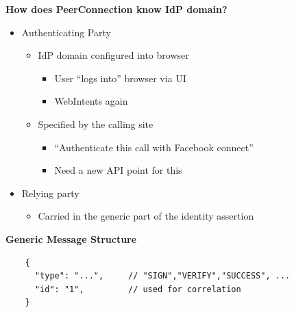 \documentclass[helvetica]{seminar}
\newcommand{\heading}[1]{%
  \begin{center} 
    \large\bf 
    #1 
  \end{center} 
  \vspace{.4 in}}
\begin{document}
\begin{slide}
\heading{How does PeerConnection know IdP domain?}

\begin{itemize}
\item Authenticating Party

  \begin{itemize}
  \item IdP domain configured into browser
    \begin{itemize}
    \item User ``logs into'' browser via UI
    \item WebIntents again
    \end{itemize}

  \item Specified by the calling site
    \begin{itemize}
    \item ``Authenticate this call with Facebook connect''
    \item Need a new API point for this
    \end{itemize}
  \end{itemize}

\item Relying party
  \begin{itemize}
  \item Carried in the generic part of the identity assertion
  \end{itemize}
\end{itemize}

\end{slide}



\begin{slide}
\heading{Generic Message Structure}

\begin{verbatim}
    {
      "type": "...",     // "SIGN","VERIFY","SUCCESS", ...
      "id": "1",         // used for correlation
    }
\end{verbatim}

\end{slide}
\end{document}
